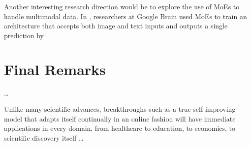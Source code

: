 \documentclass[../main.tex]{subfiles}
\begin{document}
    Another interesting research direction would be to explore the use of MoEs to handle multimodal data. In \cite{mustafa_multimodal_2022}, researchers at Google Brain used MoEs to train an architecture that accepts both image and text inputs and outputs a single prediction by 
    


    



    \section{Final Remarks} \label{conclusions:final_remarks} 
    
    \dots

    Unlike many scientific advances, breakthroughs such as a true self-improving model that adapts itself continually in an online fashion will have immediate applications in every domain, from healthcare to education, to economics, to scientific discovery itself \dots 

\end{document}
